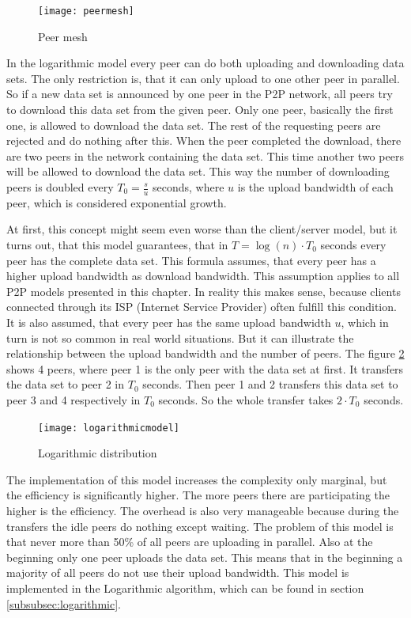 \begin{figure}[H]
\centering
\texttt{[image: peermesh]}
\caption{Peer mesh}
\label{fig:peermesh}
\end{figure}

In the logarithmic model every peer can do both uploading and downloading data sets. The only restriction is, that it can only upload to one other peer in parallel. So if a new data set is announced by one peer in the P2P network, all peers try to download this data set from the given peer. Only one peer, basically the first one, is allowed to download the data set. The rest of the requesting peers are rejected and do nothing after this. When the peer completed the download, there are two peers in the network containing the data set. This time another two peers will be allowed to download the data set. This way the number of downloading peers is doubled every $T_0 = \frac{s}{u}$ seconds, where $u$ is the upload bandwidth of each peer, which is considered exponential growth.

At first, this concept might seem even worse than the client/server model, but it turns out, that this model guarantees, that in $T=\log{(n)} \cdot T_0$  seconds every peer has the complete data set. This formula assumes, that every peer has a higher upload bandwidth as download bandwidth. This assumption applies to all P2P models presented in this chapter. In reality this makes sense, because clients connected through its ISP (Internet Service Provider) often fulfill this condition. It is also assumed, that every peer has the same upload bandwidth $u$, which in turn is not so common in real world situations. But it can illustrate the relationship between the upload bandwidth and the number of peers. The figure \ref{fig:logarithmicmodel} shows 4 peers, where peer 1 is the only peer with the data set at first. It transfers the data set to peer 2 in $T_0$ seconds. Then peer 1 and 2 transfers this data set to peer 3 and 4 respectively in $T_0$ seconds. So the whole transfer takes $2 \cdot T_0$ seconds.

\begin{figure}[H]
\centering
\texttt{[image: logarithmicmodel]}
\caption{Logarithmic distribution}
\label{fig:logarithmicmodel}
\end{figure}

The implementation of this model increases the complexity only marginal, but the efficiency is significantly higher. The more peers there are participating the higher is the efficiency. The overhead is also very manageable because during the transfers the idle peers do nothing except waiting. The problem of this model is that never more than 50\% of all peers are uploading in parallel. Also at the beginning only one peer uploads the data set. This means that in the beginning a majority of all peers do not use their upload bandwidth. This model is implemented in the Logarithmic algorithm, which can be found in section \ref{subsubsec:logarithmic}.

